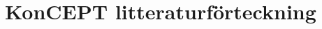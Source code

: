 \onecolumn
\chapter{KonCEPT litteraturförteckning}
\label{konceptlitteratur}

\begin{flushleft}
  \renewcommand{\chapter}[2]{}%


\end{flushleft}

\twocolumn










